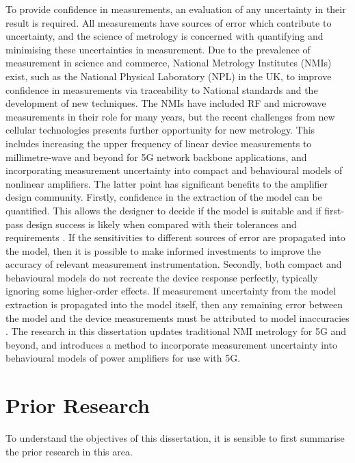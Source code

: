 \documentclass[../thesis/thesis.tex]{subfiles}
\begin{document}
To provide confidence in measurements, an evaluation of any uncertainty in their result is required. All measurements have sources of error which contribute to uncertainty, and the science of metrology is concerned with quantifying and minimising these uncertainties in measurement. Due to the prevalence of measurement in science and commerce, National Metrology Institutes (NMIs) exist, such as the National Physical Laboratory (NPL) in the UK, to improve confidence in measurements via traceability to National standards and the development of new techniques. The NMIs have included RF and microwave measurements in their role for many years, but the recent challenges from new cellular technologies presents further opportunity for new metrology. This includes increasing the upper frequency of linear device measurements to millimetre-wave and beyond for 5G network backbone applications, and incorporating measurement uncertainty into compact and behavioural models of nonlinear amplifiers. The latter point has significant benefits to the amplifier design community. Firstly, confidence in the extraction of the model can be quantified. This allows the designer to decide if the model is suitable and if first-pass design success is likely when compared with their tolerances and requirements \cite{Williams_2016B}. If the sensitivities to different sources of error are propagated into the model, then it is possible to make informed investments to improve the accuracy of relevant measurement instrumentation. Secondly, both compact and behavioural models do not recreate the device response perfectly, typically ignoring some higher-order effects. If measurement uncertainty from the model extraction is propagated into the model itself, then any remaining error between the model and the device measurements must be attributed to model inaccuracies \cite{Cheron_2018}. The research in this dissertation updates traditional NMI metrology for 5G and beyond, and introduces a method to incorporate measurement uncertainty into behavioural models of power amplifiers for use with 5G.

\section{Prior Research}

To understand the objectives of this dissertation, it is sensible to first summarise the prior research in this area.
\end{document}
